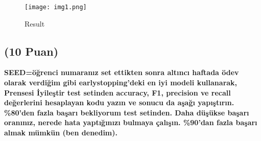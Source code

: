\documentclass[11pt]{article}
\begin{document}
\begin{figure}[H]
    \centering
    \texttt{[image: img1.png]}
    \caption{Result}
    \label{fig:my_pic}
\end{figure}


\subsection{(10 Puan)} \textbf{SEED=öğrenci numaranız set ettikten sonra altıncı haftada ödev olarak verdiğim gibi earlystopping'deki en iyi modeli kullanarak, Prensesi İyileştir test setinden accuracy, F1, precision ve recall değerlerini hesaplayan kodu yazın ve sonucu da aşağı yapıştırın. \%80'den fazla başarı bekliyorum test setinden. Daha düşükse başarı oranınız, nerede hata yaptığınızı bulmaya çalışın. \%90'dan fazla başarı almak mümkün (ben denedim).}
\end{document}

